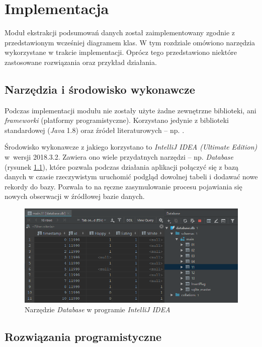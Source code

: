\chapter{Implementacja}

Moduł ekstrakcji podsumowań danych został zaimplementowany zgodnie z przedstawionym wcześniej diagramem klas. W tym rozdziale omówiono narzędzia wykorzystane w trakcie implementacji. Oprócz tego przedstawiono niektóre zastosowane rozwiązania oraz przykład działania.


\section{Narzędzia i środowisko wykonawcze}

Podczas implementacji modułu nie zostały użyte żadne zewnętrzne biblioteki, ani \textit{frameworki} (platformy programistyczne). Korzystano jedynie z biblioteki standardowej (\textit{Java} 1.8) oraz źródeł literaturowych -- np. \cite{java}.

Środowisko wykonawcze z jakiego korzystano to \textit{IntelliJ IDEA (Ultimate Edition)} w~wersji 2018.3.2. Zawiera ono wiele przydatnych narzędzi -- np. \textit{Database} (rysunek \ref{rys:database}), które pozwala podczas działania aplikacji połączyć się z bazą danych w czasie rzeczywistym uruchomić podgląd dowolnej tabeli i dodawać nowe rekordy do bazy. Pozwala to na ręczne zasymulowanie procesu pojawiania się nowych obserwacji w źródłowej bazie danych.

\begin{figure} 
	\centering\includegraphics[width=\textwidth]{img/database}
	\caption{Narzędzie \textit{Database} w programie \textit{IntelliJ IDEA}}
	\label{rys:database}
\end{figure}


\section{Rozwiązania programistyczne}

